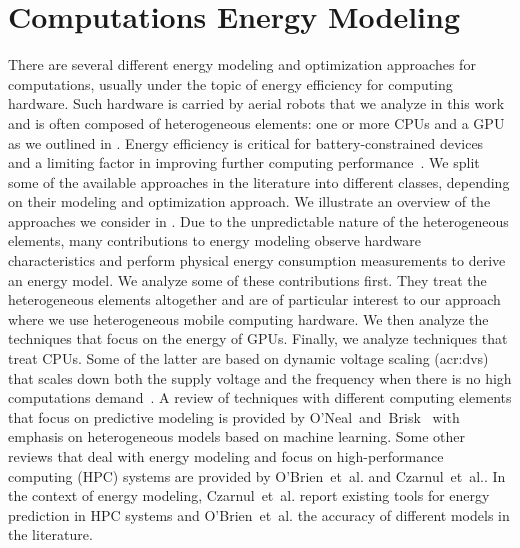 \section{Computations Energy Modeling}
\label{sec:soa-ene-mod}

There are several different energy modeling and optimization approaches for computations, usually under the topic of energy efficiency for computing hardware.
Such hardware is carried by aerial robots that we analyze in this work and is often composed of heterogeneous elements: one or more CPUs and a GPU as we outlined in . Energy efficiency is critical for battery-constrained devices~\citep{rao2005battery} and a limiting factor in improving further computing performance~\citep{horowitz2014computing}. We split some of the available approaches in the literature into different classes, depending on their modeling and optimization approach. We illustrate an overview of the approaches we consider in . Due to the unpredictable nature of the heterogeneous elements, many contributions to energy modeling observe hardware characteristics and perform physical energy consumption measurements to derive an energy model. We analyze some of these contributions first. They treat the heterogeneous elements altogether and are of particular interest to our approach where we use heterogeneous mobile computing hardware. We then analyze the techniques that focus on the energy of GPUs. Finally, we analyze techniques that treat CPUs. Some of the latter are based on dynamic voltage scaling (\Gls{acr:dvs}) that scales down both the supply voltage and the frequency when there is no high computations demand~\citep{flautner2001automatic, chen2009fundamentals}. A review of techniques with different computing elements that focus on predictive modeling is provided by O'Neal~and~Brisk~\citep{oneal2018predictive} with emphasis on heterogeneous models based on machine learning.
Some other reviews that deal with energy modeling and focus on high-performance computing (HPC) systems are provided by O'Brien~et~al.\citep{obrien2017survey} and Czarnul~et~al.\citep{czarnul2019energy}. In the context of energy modeling, Czarnul~et~al. report existing tools for energy prediction in HPC systems and O'Brien~et~al. the accuracy of different models in the literature.

